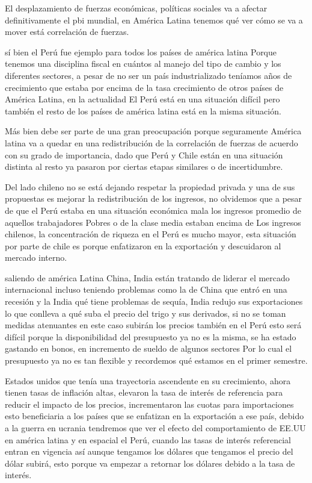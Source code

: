 \documentclass[
  letterpaper,
  DIV=11,
  numbers=noendperiod]{scrartcl}
\begin{document}
El desplazamiento de fuerzas económicas, políticas sociales va a afectar
definitivamente el pbi mundial, en América Latina tenemos qué ver cómo
se va a mover está correlación de fuerzas.

sí bien el Perú fue ejemplo para todos los países de américa latina
Porque tenemos una disciplina fiscal en cuántos al manejo del tipo de
cambio y los diferentes sectores, a pesar de no ser un país
industrializado teníamos años de crecimiento que estaba por encima de la
tasa crecimiento de otros países de América Latina, en la actualidad El
Perú está en una situación difícil pero también el resto de los países
de américa latina está en la misma situación.

Más bien debe ser parte de una gran preocupación porque seguramente
América latina va a quedar en una redistribución de la correlación de
fuerzas de acuerdo con su grado de importancia, dado que Perú y Chile
están en una situación distinta al resto ya pasaron por ciertas etapas
similares o de incertidumbre.

Del lado chileno no se está dejando respetar la propiedad privada y una
de sus propuestas es mejorar la redistribución de los ingresos, no
olvidemos que a pesar de que el Perú estaba en una situación económica
mala los ingresos promedio de aquellos trabajadores Pobres o de la clase
media estaban encima de Los ingresos chilenos, la concentración de
riqueza en el Perú es mucho mayor, esta situación por parte de chile es
porque enfatizaron en la exportación y descuidaron al mercado interno.

saliendo de américa Latina China, India están tratando de liderar el
mercado internacional incluso teniendo problemas como la de China que
entró en una recesión y la India qué tiene problemas de sequía, India
redujo sus exportaciones lo que conlleva a qué suba el precio del trigo
y sus derivados, si no se toman medidas atenuantes en este caso subirán
los precios también en el Perú esto será difícil porque la
disponibilidad del presupuesto ya no es la misma, se ha estado gastando
en bonos, en incremento de sueldo de algunos sectores Por lo cual el
presupuesto ya no es tan flexible y recordemos qué estamos en el primer
semestre.

Estados unidos que tenía una trayectoria ascendente en su crecimiento,
ahora tienen tasas de inflación altas, elevaron la tasa de interés de
referencia para reducir el impacto de los precios, incrementaron las
cuotas para importaciones esto beneficiaria a los países que se
enfatizan en la exportación a ese país, debido a la guerra en ucrania
tendremos que ver el efecto del comportamiento de EE.UU en américa
latina y en espacial el Perú, cuando las tasas de interés referencial
entran en vigencia así aunque tengamos los dólares que tengamos el
precio del dólar subirá, esto porque va empezar a retornar los dólares
debido a la tasa de interés.
\end{document}
